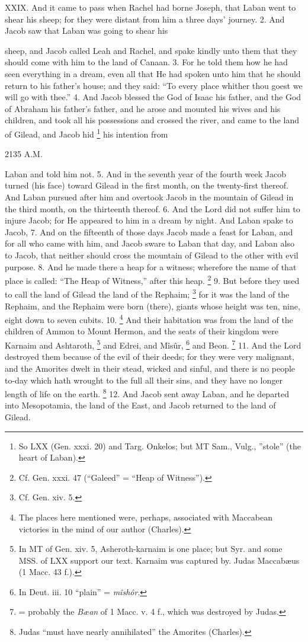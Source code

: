 
XXIX. And it came to pass when Rachel had borne Joseph, that Laban went to shear his sheep; for they were distant from him a three days' journey. 2. And Jacob saw that Laban was going to shear his

sheep, and Jacob called Leah and Rachel, and spake kindly unto them that they should come with him to the land of Canaan. 3. For he told them how he had seen everything in a dream, even all that He had spoken unto him that he should return to his father's house; and they said: ``To every place whither thou goest we will go with thee.'' 4. And Jacob blessed the God of Isaac his father, and the God of Abraham his father's father, and he arose and mounted his wives and his children, and took all his possessions and crossed the river, and came to the land of Gilead, and Jacob hid \footnote{So LXX (Gen. xxxi. 20) and Targ. Onkelos; but MT Sam., Vulg., ''stole'' (the heart of Laban).} his intention from

2135 A.M.

Laban and told him not. 5. And in the seventh year of the fourth week Jacob turned (his face) toward Gilead in the first month, on the twenty-first thereof. And Laban pursued after him and overtook Jacob in the mountain of Gilead in the third month, on the thirteenth thereof. 6. And the Lord did not suffer him to injure Jacob; for He appeared to him in a dream by night. And Laban spake to Jacob, 7. And on the fifteenth of those days Jacob made a feast for Laban, and for all who came with him, and Jacob sware to Laban that day, and Laban also to Jacob, that neither should cross the mountain of Gilead to the other with evil purpose. 8. And he made there a heap for a witness; wherefore the name of that place is called: ``The Heap of Witness,'' after this heap. \footnote{Cf. Gen. xxxi. 47 (``Galeed'' = ``Heap of Witness'').} 9. But before they used to call the land of Gilead the land of the Rephaim; \footnote{Cf. Gen. xiv. 5.} for it was the land of the Rephaim, and the Rephaim were born (there), giants whose height was ten, nine, eight down to seven cubits. 10. \footnote{The places here mentioned were, perhaps, associated with Maccabean victories in the mind of our author (Charles).} And their habitation was from the land of the children of Ammon to Mount Hermon, and the seats of their kingdom were Karnaim and Ashtaroth, \footnote{In MT of Gen. xiv. 5, Asheroth-karnaim is one place; but Syr. and some MSS. of LXX support our text. Karnaim was captured by. Judas Maccabæus (1 Macc. 43 f.).} and Edrei, and Mîsûr, \footnote{In Deut. iii. 10 ``plain'' = \emph{mîshôr}.} and Beon. \footnote{= probably the \emph{Bæan} of 1 Macc. v. 4 f., which was destroyed by Judas.} 11. And the Lord destroyed them because of the evil of their deeds; for they were very malignant, and the Amorites dwelt in their stead, wicked and sinful, and there is no people to-day which hath wrought to the full all their sins, and they have no longer length of life on the earth. \footnote{Judas ``must have nearly annihilated'' the Amorites (Charles).} 12. And Jacob sent away Laban, and he departed into Mesopotamia, the land of the East, and Jacob returned to the land of Gilead.

